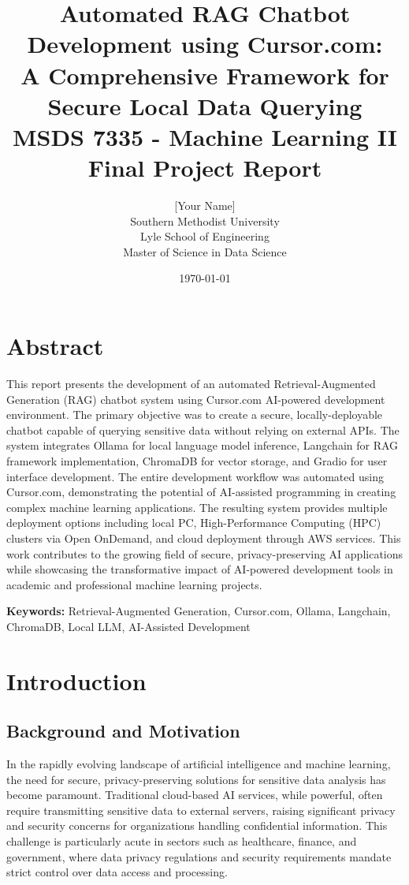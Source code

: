 \documentclass[12pt,letterpaper]{article}
\title{
    \vspace{2in}
    \textbf{\Large Automated RAG Chatbot Development using Cursor.com: \\
    A Comprehensive Framework for Secure Local Data Querying} \\
    \vspace{0.5in}
    \large MSDS 7335 - Machine Learning II \\
    Final Project Report \\
    \vspace{0.5in}
}
\author{
    [Your Name] \\
    Southern Methodist University \\
    Lyle School of Engineering \\
    Master of Science in Data Science \\
    \vspace{0.25in}
}
\date{\today}
\begin{document}
\maketitle
\thispagestyle{empty}
\newpage

\tableofcontents
\newpage

\listoffigures
\newpage

\listoftables
\newpage

\section{Abstract}

This report presents the development of an automated Retrieval-Augmented Generation (RAG) chatbot system using Cursor.com AI-powered development environment. The primary objective was to create a secure, locally-deployable chatbot capable of querying sensitive data without relying on external APIs. The system integrates Ollama for local language model inference, Langchain for RAG framework implementation, ChromaDB for vector storage, and Gradio for user interface development. The entire development workflow was automated using Cursor.com, demonstrating the potential of AI-assisted programming in creating complex machine learning applications. The resulting system provides multiple deployment options including local PC, High-Performance Computing (HPC) clusters via Open OnDemand, and cloud deployment through AWS services. This work contributes to the growing field of secure, privacy-preserving AI applications while showcasing the transformative impact of AI-powered development tools in academic and professional machine learning projects.

\textbf{Keywords:} Retrieval-Augmented Generation, Cursor.com, Ollama, Langchain, ChromaDB, Local LLM, AI-Assisted Development

\newpage

\section{Introduction}

\subsection{Background and Motivation}

In the rapidly evolving landscape of artificial intelligence and machine learning, the need for secure, privacy-preserving solutions for sensitive data analysis has become paramount. Traditional cloud-based AI services, while powerful, often require transmitting sensitive data to external servers, raising significant privacy and security concerns for organizations handling confidential information. This challenge is particularly acute in sectors such as healthcare, finance, and government, where data privacy regulations and security requirements mandate strict control over data access and processing.
\end{document}
